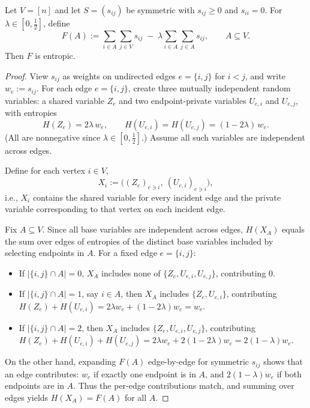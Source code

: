 \documentclass[10pt,a4paper]{amsart}
\begin{document}
\begin{theorem}
\label{thm:monotone_graphcut_entropic}
Let $V=[n]$ and let $S=(s_{ij})$ be symmetric with $s_{ij}\ge 0$ and $s_{ii}=0$.
For $\lambda\in[0,\tfrac12]$, define
\[
F(A):=\sum_{i\in A}\sum_{j\in V} s_{ij} \;-\; \lambda \sum_{i\in A}\sum_{j\in A} s_{ij},\qquad A\subseteq V.
\]
Then $F$ is entropic.
\end{theorem}

\begin{proof}
View $s_{ij}$ as weights on undirected edges $e=\{i,j\}$ for $i<j$, and write $w_e:=s_{ij}$.
For each edge $e=\{i,j\}$, create three mutually independent random variables:
a shared variable $Z_e$ and two endpoint-private variables $U_{e,i}$ and $U_{e,j}$, with entropies
\[
H(Z_e)=2\lambda\,w_e,\qquad H(U_{e,i})=H(U_{e,j})=(1-2\lambda)\,w_e.
\]
(All are nonnegative since $\lambda\in[0,\tfrac12]$.) Assume all such variables are independent across edges.

Define for each vertex $i\in V$,
\[
X_i := \Big((Z_e)_{e\ni i},\ (U_{e,i})_{e\ni i}\Big),
\]
i.e., $X_i$ contains the shared variable for every incident edge and the private variable corresponding
to that vertex on each incident edge.

Fix $A\subseteq V$. Since all base variables are independent across edges, $H(X_A)$ equals the sum over edges
of entropies of the distinct base variables included by selecting endpoints in $A$. For a fixed edge $e=\{i,j\}$:

\begin{itemize}
\item If $|\{i,j\}\cap A|=0$, $X_A$ includes none of $\{Z_e,U_{e,i},U_{e,j}\}$, contributing $0$.
\item If $|\{i,j\}\cap A|=1$, say $i\in A$, then $X_A$ includes $\{Z_e,U_{e,i}\}$, contributing
$H(Z_e)+H(U_{e,i})=2\lambda w_e+(1-2\lambda)w_e=w_e$.
\item If $|\{i,j\}\cap A|=2$, then $X_A$ includes $\{Z_e,U_{e,i},U_{e,j}\}$, contributing
$H(Z_e)+H(U_{e,i})+H(U_{e,j})=2\lambda w_e+2(1-2\lambda)w_e=2(1-\lambda)w_e$.
\end{itemize}

On the other hand, expanding $F(A)$ edge-by-edge for symmetric $s_{ij}$ shows that an edge contributes:
$w_e$ if exactly one endpoint is in $A$, and $2(1-\lambda)w_e$ if both endpoints are in $A$.
Thus the per-edge contributions match, and summing over edges yields $H(X_A)=F(A)$ for all $A$.
\end{proof}
\end{document}
